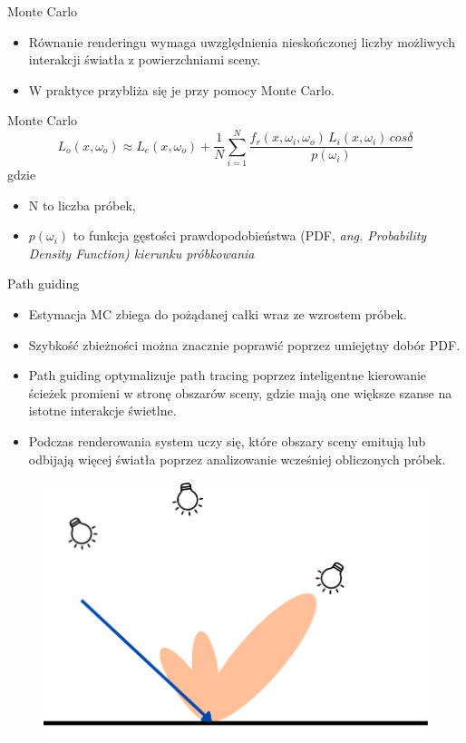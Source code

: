 \documentclass{beamer}
\begin{document}
\begin{frame}{Monte Carlo}
    \begin{itemize}
        \item Równanie renderingu wymaga uwzględnienia nieskończonej liczby możliwych interakcji światła z powierzchniami sceny.
        \item W praktyce przybliża się je przy pomocy Monte Carlo.
    \end{itemize}
\end{frame}

\begin{frame}{Monte Carlo}
$$L_o(x, \omega_o) \approx L_e(x, \omega_o) + \frac{1}{N} \sum_{i=1}^{N} \frac{f_r(x, \omega_i, \omega_o) \, L_i(x, \omega_i) \, cos\delta}{p(\omega_i)}
$$
gdzie
\begin{itemize}
    \item N to liczba próbek,
    \item $p(\omega_i)$ to funkcja gęstości prawdopodobieństwa (PDF, \it{ang. Probability Density Function}) \normalfont kierunku próbkowania
\end{itemize}
\end{frame}

\begin{frame}{Path guiding}
    \begin{itemize}
        \item Estymacja MC zbiega do pożądanej całki wraz ze wzrostem próbek.
        \item Szybkość zbieżności można znacznie poprawić poprzez umiejętny dobór PDF.
        \item Path guiding optymalizuje path tracing poprzez inteligentne kierowanie ścieżek promieni w stronę obszarów sceny, gdzie mają one większe szanse na istotne interakcje świetlne.
        \item Podczas renderowania system uczy się, które obszary sceny emitują lub odbijają więcej światła poprzez analizowanie wcześniej obliczonych próbek.
    \end{itemize}
\end{frame}

\begin{frame}
\begin{figure}
    \centering
    \includegraphics[width=0.9\linewidth]{img/PDF.png}
    \label{fig:enter-label}
\end{figure}
\end{frame}
\end{document}
